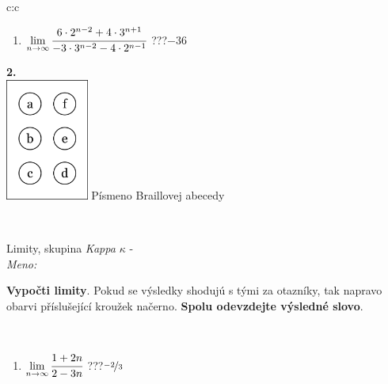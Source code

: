 \documentclass[10pt]{report}
\begin{document}
\begin{tabular}{c:c}
\begin{minipage}[c][104.5mm][t]{0.5\linewidth}
\begin{center}
\begin{minipage}{0.79\linewidth}
\begin{center}
\begin{varwidth}{\linewidth}
\begin{enumerate}
\item $\lim\limits_{n\to\infty}\cfrac{6\cdot 2^{n-2}+4\cdot 3^{n+1}}{-3\cdot 3^{n-2}-4\cdot 2^{n-1}}$\quad \dotfill\; ???\;\dotfill \quad $-36$
\end{enumerate}
\end{varwidth}
\end{center}
\end{minipage}
\begin{minipage}{0.20\linewidth}
\begin{center}
{\Huge\bfseries 2.} \\[2mm]
\includegraphics[height=40mm]{../images/braille.png}
{\small Písmeno Braillovej abecedy}
\end{center}
\end{minipage}
\end{center}
\end{minipage}
\\ \hdashline
\begin{minipage}[c][104.5mm][t]{0.5\linewidth}
\begin{center}
\vspace{7mm}
{\huge Limity, skupina \textit{Kappa $\kappa$} -}\\[5mm]
\textit{Meno:}\phantom{xxxxxxxxxxxxxxxxxxxxxxxxxxxxxxxxxxxxxxxxxxxxxxxxxxxxxxxxxxxxxxxxx}\\[5mm]
\begin{minipage}{0.95\linewidth}
\begin{center}
\textbf{Vypočti limity}. Pokud se výsledky shodujú s tými za otazníky, tak napravo\\obarvi příslušející kroužek načerno. \textbf{Spolu odevzdejte výsledné slovo}.
\end{center}
\end{minipage}
\\[1mm]
\begin{minipage}{0.79\linewidth}
\begin{center}
\begin{varwidth}{\linewidth}
\begin{enumerate}
\normalsize
\item $\lim\limits_{n\to\infty}\cfrac{1+2n}{2-3n}$\quad \dotfill\; ???\;\dotfill \quad $\nicefrac{-2}{3}$

\end{enumerate}
\end{varwidth}
\end{center}
\end{minipage}
\end{center}
\end{minipage}
\end{tabular}
\end{document}
